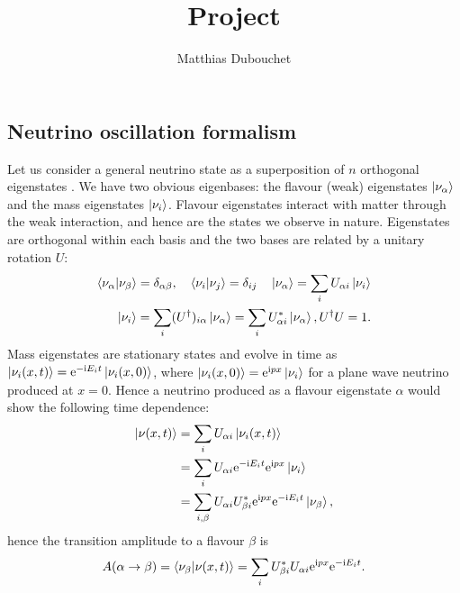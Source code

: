 \documentclass[10pt, a4paper]{article}
\title{Project}
\author{Matthias Dubouchet}
\date{}
\newcommand{\me}{\mathrm{e}}
\newcommand{\mi}{\mathrm{i}}
\begin{document}
\maketitle

\subsection{Neutrino oscillation formalism} 
Let us consider a general neutrino state as a superposition of $n$ orthogonal
eigenstates \cite{zuber}. We have two obvious eigenbases: the flavour (weak) eigenstates
$\ket{\nu_{\alpha}}$ and the mass eigenstates $\ket{\nu_i}$. Flavour
eigenstates interact with matter through the weak interaction,
and hence are the states we observe in nature.
Eigenstates are orthogonal within each basis and the two bases are related by a
unitary rotation $U$: 
\begin{align*}
\bra{\nu_\alpha}\ket{\nu_\beta} = \delta_{\alpha \beta}, \quad
\bra{\nu_i}\ket{\nu_j} = \delta_{ij}  \quad
\ket{\nu_\alpha} = \sum_i U_{\alpha i} \ket{\nu_i}\\
\ket{\nu_i} = \sum_i (U^\dagger)_{i \alpha} \ket{\nu_\alpha} = \sum_i
	U^*_{\alpha i} \ket{\nu_\alpha}, U^\dagger U = 1.
\end{align*}
Mass eigenstates are stationary states and evolve in time as $\ket{\nu_i(x,
t)} = \me^{-\mi E_i t} \ket{\nu_i(x, 0)}$, where $\ket{\nu_i(x, 0)} = \me^{\mi p
x} \ket{\nu_i}$ for a plane wave neutrino produced at $x=0$.
Hence a neutrino produced as a flavour eigenstate $\alpha$ would show the
following time dependence:
\begin{align*}
\ket{\nu(x, t)} &= \sum_i U_{\alpha i} \ket{\nu_i(x, t)} \\
		&= \sum_i U_{\alpha i} \me^{-\mi E_i t} \me^{\mi p x} \ket{\nu_i}\\
		&= \sum_{i, \beta} U_{\alpha i} U^*_{\beta i} \me^{\mi p x}
				\me^{-\mi E_i t} \ket{\nu_\beta},
\end{align*}
hence the transition amplitude to a flavour $\beta$ is 
\begin{align}
A(\alpha \rightarrow \beta) = \bra{\nu_\beta}\ket{\nu(x, t)} \nonumber
			= \sum_i U^*_{\beta i} U_{\alpha i} \me^{\mi p x}
			\me^{-\mi E_i t}.
\end{align}
\end{document}
